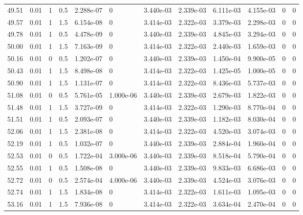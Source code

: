 \documentclass[preview]{standalone}
\begin{document}
{{{{{\begin{tabular}{L{1.2cm}C{1.2cm} C{0.3cm}C{0.5cm} C{1.4cm}C{1.4cm} C{1.4cm}C{1.4cm} C{1.6cm}C{1.6cm} C{1.6cm}C{1.6cm}}
  49.51  &  0.01  & 1     & 0.5 &  2.288e-07  & 0  &  3.440e-03&   2.339e-03& 6.111e-03 & 4.155e-03   &  0 & 0  \\ 
  49.57  &  0.01  & 1     & 1.5 &  6.154e-08  & 0  &  3.414e-03&   2.322e-03& 3.379e-03 & 2.298e-03   &  0 & 0  \\ 
  49.78  &  0.01  & 1     & 0.5 &  4.478e-09  & 0  &  3.440e-03&   2.339e-03& 4.845e-03 & 3.294e-03   &  0 & 0  \\ 
  50.00  &  0.01  & 1     & 1.5 &  7.163e-09  & 0  &  3.414e-03&   2.322e-03& 2.440e-03 & 1.659e-03   &  0 & 0  \\ 
  50.16  &  0.01  & 0     & 0.5 &  1.202e-07  & 0  &  3.440e-03&   2.339e-03& 1.450e-04 & 9.900e-05   &  0 & 0  \\ 
  50.43  &  0.01  & 1     & 1.5 &  8.498e-08  & 0  &  3.414e-03&   2.322e-03& 1.425e-05 & 1.000e-05   &  0 & 0  \\ 
  50.90  &  0.01  & 1     & 1.5 &  1.131e-07  & 0  &  3.414e-03&   2.322e-03& 8.436e-03 & 5.737e-03   &  0 & 0  \\ 
  51.08  &  0.01  & 0     & 0.5 &  5.761e-05  & 1.000e-06  &  3.440e-03&   2.339e-03& 2.679e-03 & 1.822e-03   &  0 & 0  \\ 
  51.48  &  0.01  & 1     & 1.5 &  3.727e-09  & 0  &  3.414e-03&   2.322e-03& 1.290e-03 & 8.770e-04   &  0 & 0  \\ 
  51.51  &  0.01  & 1     & 0.5 &  2.093e-07  & 0  &  3.440e-03&   2.339e-03& 1.182e-03 & 8.030e-04   &  0 & 0  \\ 
  52.06  &  0.01  & 1     & 1.5 &  2.381e-08  & 0  &  3.414e-03&   2.322e-03& 4.520e-03 & 3.074e-03   &  0 & 0  \\ 
  52.19  &  0.01  & 1     & 0.5 &  1.032e-07  & 0  &  3.440e-03&   2.339e-03& 2.884e-04 & 1.960e-04   &  0 & 0  \\ 
  52.53  &  0.01  & 0     & 0.5 &  1.722e-04  & 3.000e-06  &  3.440e-03&   2.339e-03& 8.518e-04 & 5.790e-04   &  0 & 0  \\ 
  52.55  &  0.01  & 1     & 0.5 &  1.508e-08  & 0  &  3.440e-03&   2.339e-03& 9.833e-03 & 6.686e-03   &  0 & 0  \\ 
  52.72  &  0.01  & 0     & 0.5 &  2.574e-04  & 4.000e-06  &  3.440e-03&   2.339e-03& 4.524e-03 & 3.076e-03   &  0 & 0  \\ 
  52.74  &  0.01  & 1     & 1.5 &  1.834e-08  & 0  &  3.414e-03&   2.322e-03& 1.611e-03 & 1.095e-03   &  0 & 0  \\ 
  53.16  &  0.01  & 1     & 1.5 &  7.936e-08  & 0  &  3.414e-03&   2.322e-03& 3.634e-04 & 2.470e-04   &  0 & 0  \\ 

\end{tabular}}}}}}
\end{document}
